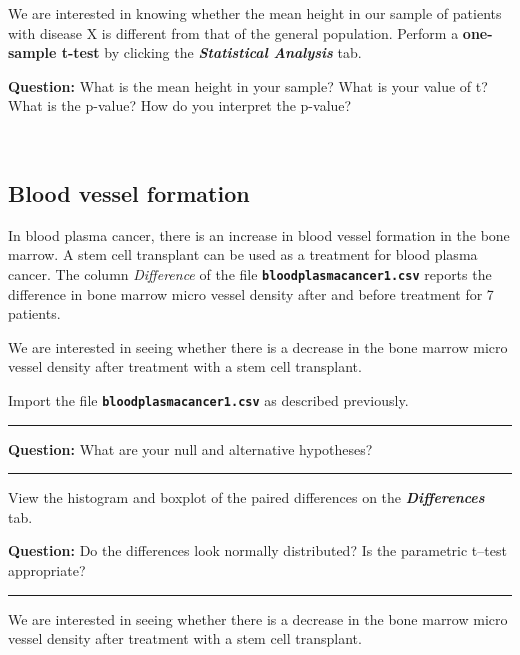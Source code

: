 \documentclass[]{article}
\begin{document}
We are interested in knowing whether the mean height in our sample of
patients with disease X is different from that of the general
population. Perform a \textbf{one-sample t-test} by clicking the
\textbf{\emph{Statistical Analysis}} tab.

{\textbf{Question:}} What is the mean height in your sample? What is
your value of t? What is the p-value? How do you interpret the p-value?

~

\hypertarget{blood-vessel-formation}{%
\subsection{Blood vessel formation}\label{blood-vessel-formation}}

In blood plasma cancer, there is an increase in blood vessel formation
in the bone marrow. A stem cell transplant can be used as a treatment
for blood plasma cancer. The column \emph{Difference} of the file
\textbf{\texttt{bloodplasmacancer1.csv}} reports the difference in bone
marrow micro vessel density after and before treatment for 7 patients.

We are interested in seeing whether there is a decrease in the bone
marrow micro vessel density after treatment with a stem cell transplant.

Import the file \textbf{\texttt{bloodplasmacancer1.csv}} as described
previously.

\begin{center}\rule{0.5\linewidth}{\linethickness}\end{center}

{\textbf{Question:}} What are your null and alternative hypotheses?

\begin{center}\rule{0.5\linewidth}{\linethickness}\end{center}

View the histogram and boxplot of the paired differences on the
\textbf{\emph{Differences}} tab.

{\textbf{Question:}} Do the differences look normally distributed? Is
the parametric t--test appropriate?

\begin{center}\rule{0.5\linewidth}{\linethickness}\end{center}

We are interested in seeing whether there is a decrease in the bone
marrow micro vessel density after treatment with a stem cell transplant.
\end{document}
